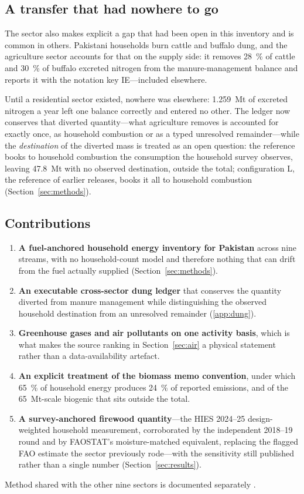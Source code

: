 \subsection{A transfer that had nowhere to go}

The sector also makes explicit a gap that had been open in this inventory and is common in others.
Pakistani households burn cattle and buffalo dung, and the agriculture sector accounts for
that on the supply side: it removes \SI{28}{\percent} of cattle and \SI{30}{\percent} of
buffalo excreted nitrogen from the manure-management balance and reports it with the notation
key IE---included elsewhere.

Until a residential sector existed, nowhere was elsewhere: \SI{1.259}{\mega\tonne} of
excreted nitrogen a year left one balance correctly and entered no other. The ledger now
conserves that diverted quantity---what agriculture removes is accounted for exactly once,
as household combustion or as a typed unresolved remainder---while the \emph{destination}
of the diverted mass is treated as an
open question: the reference books to household combustion the consumption the household
survey observes, leaving \SI{47.8}{\mega\tonne} with no observed destination, outside the
total; configuration L, the reference of earlier releases, books it all to household
combustion
(Section~\ref{sec:methods}).

\subsection{Contributions}

\begin{enumerate}[leftmargin=*,itemsep=2pt,topsep=3pt]
\item \textbf{A fuel-anchored household energy inventory for Pakistan} across nine streams,
  with no household-count model and therefore nothing that can drift from the fuel actually
  supplied (Section~\ref{sec:methods}).
\item \textbf{An executable cross-sector dung ledger} that conserves the quantity
  diverted from manure management while distinguishing the observed household
  destination from an unresolved remainder (\ref{app:dung}).
\item \textbf{Greenhouse gases and air pollutants on one activity basis}, which is what makes
  the source ranking in Section~\ref{sec:air} a physical statement rather than a
  data-availability artefact.
\item \textbf{An explicit treatment of the biomass memo convention}, under which
  \SI{65}{\percent} of household energy produces \SI{24}{\percent} of reported emissions, and
  of the \SI{65}{\mega\tonne}-scale biogenic \COtwo{} that sits outside the total.
\item \textbf{A survey-anchored firewood quantity}---the HIES 2024--25 design-weighted
  household measurement, corroborated by the independent 2018--19 round and by FAOSTAT's
  moisture-matched equivalent, replacing the flagged FAO estimate the sector previously
  rode---with the sensitivity still published rather than a single number
  (Section~\ref{sec:results}).
\end{enumerate}

Method shared with the other nine sectors is documented separately
\citep{ahmad2026national}.
